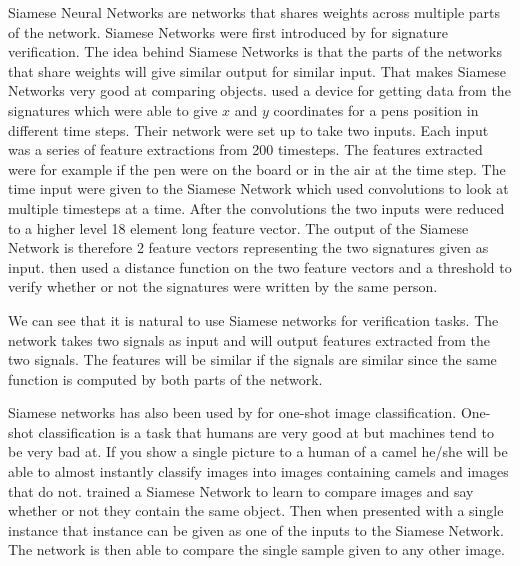 Siamese Neural Networks are networks that shares weights across multiple parts
of the network. Siamese Networks were first introduced by \citet{NIPS1993_769}
for signature verification. The idea behind Siamese Networks is that the parts
of the networks that share weights will give similar output for similar input.
That makes Siamese Networks very good at comparing objects. \citet{NIPS1993_769}
used a device for getting data from the signatures which were able to give $x$
and $y$ coordinates for a pens position in different time steps. Their network
were set up to take two inputs. Each input was a series of feature extractions
from 200 timesteps. The features extracted were for example if the pen were
on the board or in the air at the time step. The time input were given to the
Siamese Network which used convolutions to look at multiple timesteps at a time.
After the convolutions the two inputs were reduced to a higher level 18 element
long feature vector. The output of the Siamese Network is therefore 2 feature
vectors representing the two signatures given as input. \citet{NIPS1993_769}
then used a distance function on the two feature vectors and a threshold to
verify whether or not the signatures were written by the same person.

We can see that it is natural to use Siamese networks for verification tasks.
The network takes two signals as input and will output features extracted from
the two signals. The features will be similar if the signals are similar since
the same function is computed by both parts of the network.

Siamese networks has also been used by \citet{Koch2015SiameseNN} for one-shot
image classification. One-shot classification is a task that humans are very
good at but machines tend to be very bad at. If you show a single picture to
a human of a camel he/she will be able to almost instantly classify images
into images containing camels and images that do not. \citet{Koch2015SiameseNN}
trained a Siamese Network to learn to compare images and say whether or not
they contain the same object. Then when presented with a single instance that
instance can be given as one of the inputs to the Siamese Network. The network
is then able to compare the single sample given to any other image.

